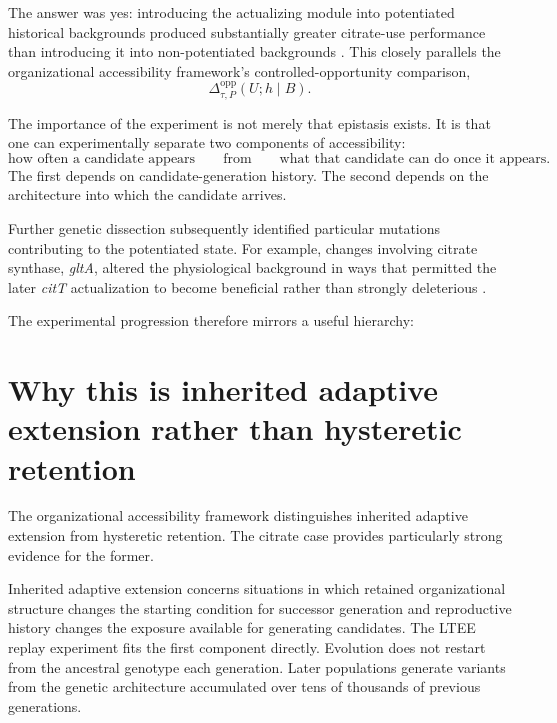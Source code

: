 \documentclass[11pt]{article}
\begin{document}
The answer was yes: introducing the actualizing module into potentiated historical backgrounds produced substantially greater citrate-use performance than introducing it into non-potentiated backgrounds \cite{Blount2012}. This closely parallels the organizational accessibility framework's controlled-opportunity comparison,
\[
\Delta_{\tau,P}^{\mathrm{opp}}(U;h\mid B).
\]

The importance of the experiment is not merely that epistasis exists. It is that one can experimentally separate two components of accessibility:
\[
\text{how often a candidate appears}
\qquad\text{from}\qquad
\text{what that candidate can do once it appears}.
\]
The first depends on candidate-generation history. The second depends on the architecture into which the candidate arrives.

Further genetic dissection subsequently identified particular mutations contributing to the potentiated state. For example, changes involving citrate synthase, \emph{gltA}, altered the physiological background in ways that permitted the later \emph{citT} actualization to become beneficial rather than strongly deleterious \cite{Quandt2015}.

The experimental progression therefore mirrors a useful hierarchy:
\begin{center}
\end{center}

\section{Why this is inherited adaptive extension rather than hysteretic retention}

The organizational accessibility framework distinguishes inherited adaptive extension from hysteretic retention. The citrate case provides particularly strong evidence for the former.

Inherited adaptive extension concerns situations in which retained organizational structure changes the starting condition for successor generation and reproductive history changes the exposure available for generating candidates. The LTEE replay experiment fits the first component directly. Evolution does not restart from the ancestral genotype each generation. Later populations generate variants from the genetic architecture accumulated over tens of thousands of previous generations.
\end{document}
